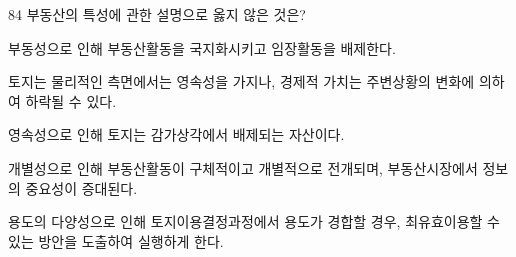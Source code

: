 \begin{question}{84}
부동산의 특성에 관한 설명으로 옳지 않은 것은?
\begin{choices}
  \item 부동성으로 인해 부동산활동을 국지화시키고 임장활동을 배제한다.
  \item 토지는 물리적인 측면에서는 영속성을 가지나, 경제적 가치는 주변상황의 변화에 의하여 하락될 수 있다.
  \item 영속성으로 인해 토지는 감가상각에서 배제되는 자산이다.
  \item 개별성으로 인해 부동산활동이 구체적이고 개별적으로 전개되며, 부동산시장에서 정보의 중요성이 증대된다.
  \item 용도의 다양성으로 인해 토지이용결정과정에서 용도가 경합할 경우, 최유효이용할 수 있는 방안을 도출하여 실행하게 한다.
\end{choices}
\end{question}
